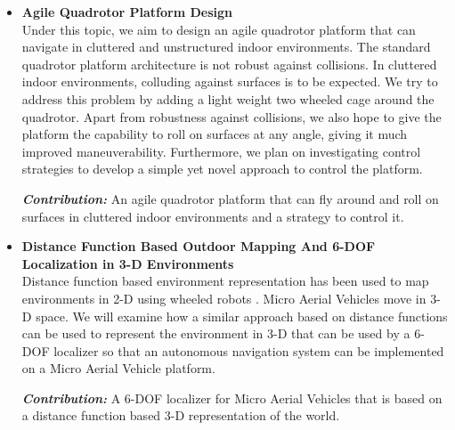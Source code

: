 \documentclass[12pt,a4paper]{report}
\begin{document}
\begin{itemize}
	\item\textbf{Agile Quadrotor Platform Design}
    \\Under this topic, we aim to design an agile quadrotor platform that can navigate in cluttered and unstructured indoor environments. The standard quadrotor platform architecture is not robust against collisions. In cluttered indoor environments, colluding against surfaces is to be expected. We try to address this problem by adding a light weight two wheeled cage around the quadrotor. Apart from robustness against collisions, we also hope to give the platform the capability to roll on surfaces at any angle, giving it much improved maneuverability. Furthermore, we plan on investigating control strategies to develop a simple yet novel approach to control the platform. \par
    \textbf{\emph{Contribution:}} 
    An agile quadrotor platform that can fly around and roll on surfaces in cluttered indoor environments and a strategy to control it.
        
    \item\textbf{Distance Function Based Outdoor Mapping And 6-DOF Localization in 3-D Environments}
    \\Distance function based environment representation has been used to map environments in 2-D using wheeled robots \cite{dantanarayana2016navigation}. Micro Aerial Vehicles move in 3-D space. We will examine how a similar approach based on distance functions can be used to represent the environment in 3-D  that can be used by a 6-DOF localizer so that an autonomous navigation system can be implemented on a Micro Aerial Vehicle platform. \par

    \textbf{\emph{Contribution:}}
    A 6-DOF localizer for Micro Aerial Vehicles that is based on a distance function based 3-D representation of the world. 
% 
% 
% 
% 
    
% 
% 
% 


\end{itemize}
\end{document}
